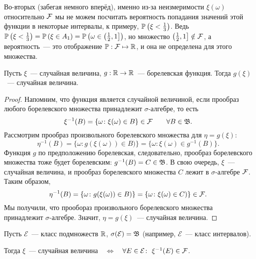 \begin{exmp}
Во-вторых (забегая немного вперёд), именно из-за неизмеримости $\xi(\omega)$ относительно $\mathcal{F}$ мы не можем посчитать вероятность попадания значений этой функции в некоторые интервалы, к примеру, $\operatorname{\mathbb{P}}\left({\xi < \frac{1}{3}}\right)$. 
Ведь $\operatorname{\mathbb{P}}\left(\xi < \frac{1}{3} \right) = \operatorname{\mathbb{P}}\left(\xi \in A_1\right) = \operatorname{\mathbb{P}}\left(\omega \in \left(\frac{1}{2}, 1\right] \right)$, но множество $\left(\frac{1}{2}, 1\right] \notin \mathcal{F}$, 
а вероятность~--- это отображение $\operatorname{\mathbb{P}}: \mathcal{F} \mapsto \mathbb{R}$, и она не определена для этого множества.
\end{exmp} 

\begin{thm*}
    Пусть $\xi$~--- случайная величина, $g: \mathbb{R} \to \mathbb{R}$~--- борелевская функция. 
    Тогда $g(\xi)$~--- случайная величина.
\end{thm*}

\begin{proof}
    Напомним, что функция является случайной величиной, если прообраз любого борелевского множества принадлежит $\sigma$-алгебре, то есть
    \begin{equation*}
        \xi^{-1}(B) = \{\omega \colon \xi(\omega) \in B \} \in \mathcal{F} \qquad \forall B \in \mathfrak{B}.
    \end{equation*}
    Рассмотрим прообраз произвольного борелевского множества для $\eta = g(\xi)$:
    \begin{equation*}
        \eta^{-1}(B) = \{\omega \colon g(\xi(\omega)) \in B) \} = \{\omega \colon \xi(\omega) \in g^{-1}(B)\}.
    \end{equation*}
    Функция $g$ по предположению борелевская, следовательно, прообраз борелевского множества тоже будет борелевским: $g^{-1}(B) = C \in \mathfrak{B}$. 
    В свою очередь, $\xi$~--- случайная величина, и прообраз борелевского множества $C$ лежит в $\sigma$-алгебре $\mathcal{F}$. 
    Таким образом, 
    \begin{equation*}
        \eta^{-1}(B) = \{\omega \colon g(\xi(\omega)) \in B) \} = \{\omega \colon \xi(\omega) \in C) \} \in \mathcal{F}.
    \end{equation*}
    Мы получили, что прообораз произвольного борелевского множества принадлежит $\sigma$-алгебре. 
    Значит, $\eta = g(\xi)$~--- случайная величина.
\end{proof}

\begin{thm*}
    Пусть $\mathcal{E}$~--- класс подмножеств $\mathbb{R}$, $\sigma(\mathcal{E}) = \mathfrak{B}$ (например, $\mathcal{E}$~--- класс интервалов).

    Тогда $\xi$~--- случайная величина\ \ $\iff$\ \ $\forall E \in \mathcal{E}\colon ~\xi^{-1}(E) \in \mathcal{F}$.
\end{thm*}

